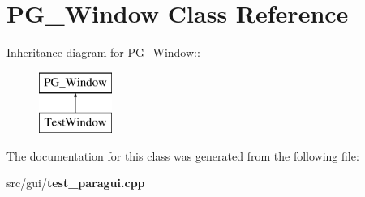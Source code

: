 \section{PG\_\-Window Class Reference}
\label{classPG__Window}
Inheritance diagram for PG\_\-Window::\begin{figure}[H]
\begin{center}
\leavevmode
\includegraphics[height=2cm]{classPG__Window}
\end{center}
\end{figure}


The documentation for this class was generated from the following file:\begin{CompactItemize}
\item 
src/gui/{\bf test\_\-paragui.cpp}\end{CompactItemize}
